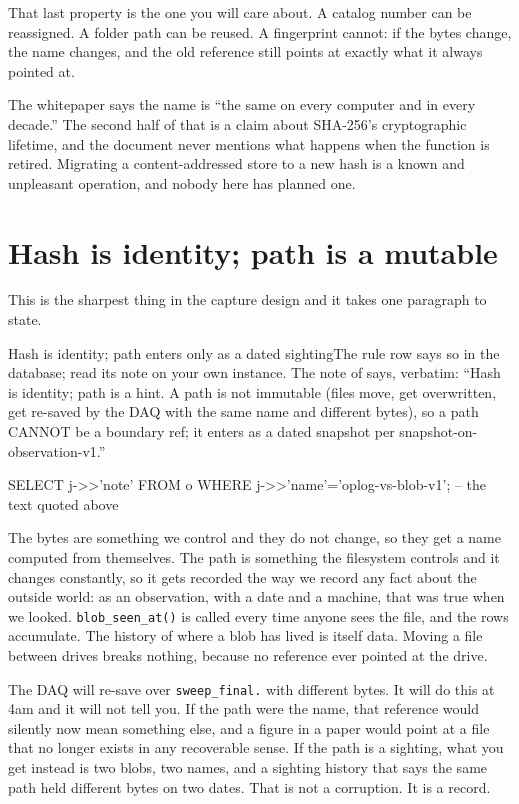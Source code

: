 That last property is the one you will care about. A catalog number can be reassigned. A folder path can be reused. A fingerprint cannot: if the bytes change, the name changes, and the old reference still points at exactly what it always pointed at.

The whitepaper says the name is ``the same on every computer and in every decade.'' The second half of that is a claim about SHA-256's cryptographic lifetime, and the document never mentions what happens when the function is retired. Migrating a content-addressed store to a new hash is a known and unpleasant operation, and nobody here has planned one.

\section{Hash is identity; path is a mutable}

This is the sharpest thing in the capture design and it takes one paragraph to state.

\begin{Correspondence}{Hash is identity; path enters only as a dated sighting}{The rule row says so in the database; read its note on your own instance.}
The note of  says, verbatim: ``Hash is identity; path is a hint. A path is not immutable (files move, get overwritten, get re-saved by the DAQ with the same name and different bytes), so a path CANNOT be a boundary ref; it enters as a dated snapshot per snapshot-on-observation-v1.''
\begin{Check}
SELECT j->>'note' FROM o WHERE j->>'name'='oplog-vs-blob-v1';  -- the text quoted above
\end{Check}
The bytes are something we control and they do not change, so they get a name computed from themselves. The path is something the filesystem controls and it changes constantly, so it gets recorded the way we record any fact about the outside world: as an observation, with a date and a machine, that was true when we looked. \texttt{blob\_seen\_at()} is called every time anyone sees the file, and the rows accumulate. The history of where a blob has lived is itself data. Moving a file between drives breaks nothing, because no reference ever pointed at the drive.
\end{Correspondence}

The DAQ will re-save over \texttt{sweep\_final.\labFileExt} with different bytes. It will do this at 4am and it will not tell you. If the path were the name, that reference would silently now mean something else, and a figure in a paper would point at a file that no longer exists in any recoverable sense. If the path is a sighting, what you get instead is two blobs, two names, and a sighting history that says the same path held different bytes on two dates. That is not a corruption. It is a record.

